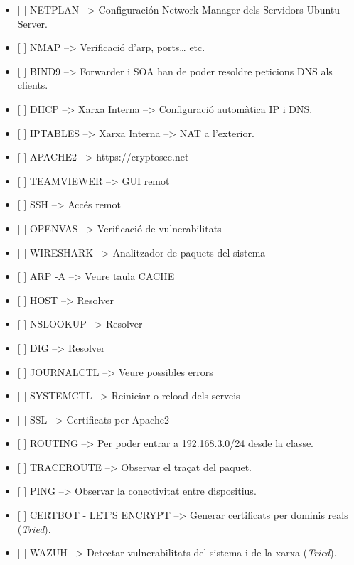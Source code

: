 \documentclass[]{article}
\providecommand{\tightlist}{%
  \setlength{\itemsep}{0pt}\setlength{\parskip}{0pt}}
\begin{document}
\begin{itemize}
\tightlist
\item
  {[} {]} NETPLAN --\textgreater{} Configuración Network Manager dels
  Servidors Ubuntu Server.
\item
  {[} {]} NMAP --\textgreater{} Verificació d'arp, ports\ldots{} etc.
\item
  {[} {]} BIND9 --\textgreater{} Forwarder i SOA han de poder resoldre
  peticions DNS als clients.
\item
  {[} {]} DHCP --\textgreater{} Xarxa Interna --\textgreater{}
  Configuració automàtica IP i DNS.
\item
  {[} {]} IPTABLES --\textgreater{} Xarxa Interna --\textgreater{} NAT a
  l'exterior.
\item
  {[} {]} APACHE2 --\textgreater{} https://cryptosec.net
\item
  {[} {]} TEAMVIEWER --\textgreater{} GUI remot
\item
  {[} {]} SSH --\textgreater{} Accés remot
\item
  {[} {]} OPENVAS --\textgreater{} Verificació de vulnerabilitats
\item
  {[} {]} WIRESHARK --\textgreater{} Analitzador de paquets del sistema
\item
  {[} {]} ARP -A --\textgreater{} Veure taula CACHE
\item
  {[} {]} HOST --\textgreater{} Resolver
\item
  {[} {]} NSLOOKUP --\textgreater{} Resolver
\item
  {[} {]} DIG --\textgreater{} Resolver
\item
  {[} {]} JOURNALCTL --\textgreater{} Veure possibles errors
\item
  {[} {]} SYSTEMCTL --\textgreater{} Reiniciar o reload dels serveis
\item
  {[} {]} SSL --\textgreater{} Certificats per Apache2
\item
  {[} {]} ROUTING --\textgreater{} Per poder entrar a 192.168.3.0/24
  desde la classe.
\item
  {[} {]} TRACEROUTE --\textgreater{} Observar el traçat del paquet.
\item
  {[} {]} PING --\textgreater{} Observar la conectivitat entre
  dispositius.
\item
  {[} {]} CERTBOT - LET'S ENCRYPT --\textgreater{} Generar certificats
  per dominis reals (\emph{Tried}).
\item
  {[} {]} WAZUH --\textgreater{} Detectar vulnerabilitats del sistema i
  de la xarxa (\emph{Tried}).
\end{itemize}
\end{document}
